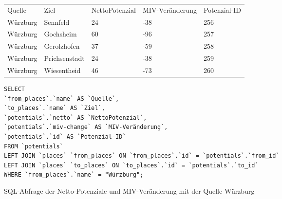 \begin{tabular}{ l  l  l  l  l }
Quelle & Ziel & NettoPotenzial & MIV-Veränderung & Potenzial-ID\\ 
Würzburg & Sennfeld & 24 & -38 & 256\\ 
Würzburg & Gochsheim & 60 & -96 & 257\\ 
Würzburg & Gerolzhofen & 37 & -59 & 258\\ 
Würzburg & Prichsenstadt & 24 & -38 & 259\\ 
Würzburg & Wiesentheid & 46 & -73 & 260\\ 
\end{tabular}
\newline
\newline
\begin{listing}[htbp]
\begin{verbatim}
SELECT
`from_places`.`name` AS `Quelle`, 
`to_places`.`name` AS `Ziel`, 
`potentials`.`netto` AS `NettoPotenzial`, 
`potentials`.`miv-change` AS `MIV-Veränderung`, 
`potentials`.`id` AS `Potenzial-ID`
FROM `potentials`
LEFT JOIN `places` `from_places` ON `from_places`.`id` = `potentials`.`from_id`
LEFT JOIN `places` `to_places` ON `to_places`.`id` = `potentials`.`to_id`
WHERE `from_places`.`name` = "Würzburg";
\end{verbatim}
\caption{SQL-Abfrage der Netto-Potenziale und MIV-Veränderung mit der Quelle Würzburg}\label{lst-fz-wuerzburg}
\end{listing}